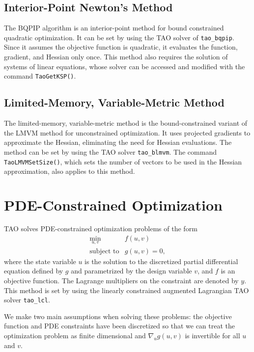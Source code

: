 \subsection{Interior-Point Newton's Method}\label{sec:bqpip}
The BQPIP algorithm is an interior-point method for bound
constrained quadratic optimization.  It can be set by using the
TAO solver of {\tt tao\_bqpip}.
Since it assumes the objective function is quadratic, 
it evaluates the function, gradient, and Hessian only once.
This method also requires the solution of systems of linear equations,
whose solver can be accessed and modified 
with the command {\tt Tao\-Get\-KSP()}.

\subsection{Limited-Memory, Variable-Metric Method}

The limited-memory, variable-metric method is the bound-constrained variant 
of the LMVM method for
unconstrained optimization.  It uses projected gradients to approximate
the Hessian, eliminating the need for Hessian evaluations.
The method can be set by using the TAO solver {\tt tao\_blmvm}.
The command {\tt Tao\-LMVM\-Set\-Size()}, which sets the number
of vectors to be used in the Hessian approximation, 
also applies to this method.

\section{PDE-Constrained Optimization}
\label{sec:lcl}

TAO solves PDE-constrained optimization problems of the form
\[
\begin{array}{ll}
\displaystyle \min_{u,v} & f(u,v) \\
\mbox{subject to} & g(u,v) = 0,
\end{array}
\]
where the state variable $u$ is the solution to the discretized
partial differential equation defined by $g$ and parametrized by 
the design variable $v$, and $f$ is an objective function.  The 
Lagrange multipliers on the constraint are denoted by $y$.
This method is set by using the linearly constrained augmented
Lagrangian TAO solver {\tt tao\_lcl}.

We make two main assumptions when solving these problems: the 
objective function and PDE constraints 
have been discretized so that we can treat the optimization problem 
as finite dimensional and $\nabla_u g(u,v)$ is invertible for all 
$u$ and $v$.

